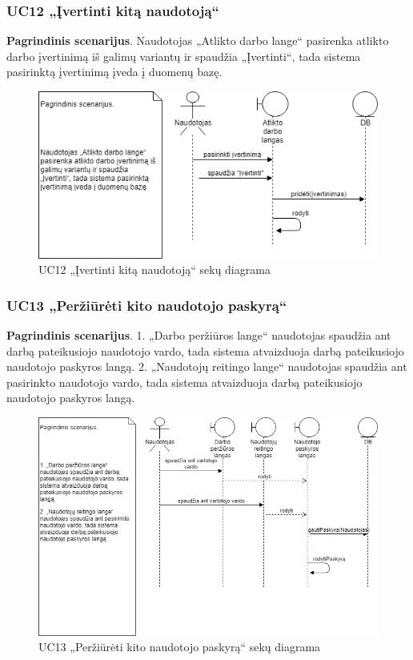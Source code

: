 \documentclass{VUMIFPSbakalaurinis}
\begin{document}
\subsubsection{UC12 „Įvertinti kitą naudotoją“}
\textbf{Pagrindinis scenarijus}. Naudotojas „Atlikto darbo lange“ pasirenka atlikto darbo įvertinimą iš galimų variantų ir spaudžia „Įvertinti“, tada sistema pasirinktą įvertinimą įveda į duomenų bazę.

\begin{figure}[H]
	\centering
	\includegraphics[scale=0.6]{img/Sequence/SD12}
	\caption{UC12 „Įvertinti kitą naudotoją“ sekų diagrama}
	\label{img:uc12seq}
\end{figure}

\subsubsection{UC13 „Peržiūrėti kito naudotojo paskyrą“}
\textbf{Pagrindinis scenarijus}. 1. „Darbo peržiūros lange“ naudotojas spaudžia ant darbą pateikusiojo naudotojo vardo, tada sistema atvaizduoja darbą pateikusiojo naudotojo paskyros langą.
2. „Naudotojų reitingo lange“ naudotojas spaudžia ant pasirinkto naudotojo vardo, tada sistema atvaizduoja darbą pateikusiojo naudotojo paskyros langą.

\begin{figure}[H]
	\centering
	\includegraphics[scale=0.6]{img/Sequence/SD13}
	\caption{UC13 „Peržiūrėti kito naudotojo paskyrą“ sekų diagrama}
	\label{img:uc13seq}
\end{figure}
\end{document}
